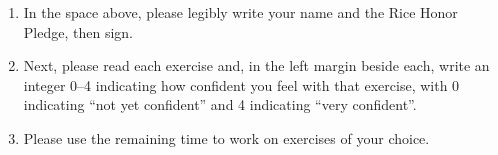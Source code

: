 \begin{enumerate}
\item In the space above, please legibly write your name and the Rice Honor Pledge, then sign.
\item Next, please read each exercise and, in the left margin beside each, write an integer 0--4 indicating how confident you feel with that exercise, with 0 indicating ``not yet confident'' and 4 indicating ``very confident''.
\item Please use the remaining time to work on exercises of your choice.
\end{enumerate}
